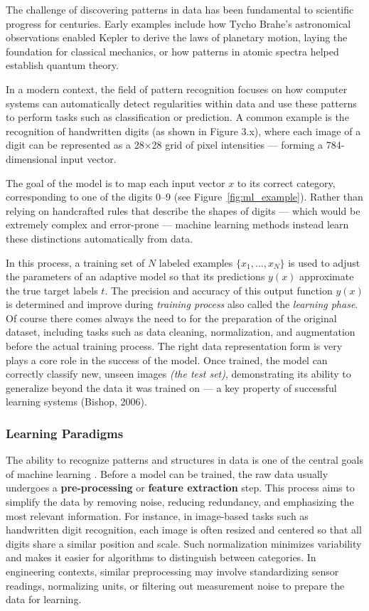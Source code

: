 \documentclass[12pt]{article}
\begin{document}
The challenge of discovering patterns in data has been fundamental to scientific progress for centuries. 
Early examples include how Tycho Brahe’s astronomical observations enabled Kepler to derive the laws of planetary motion, 
laying the foundation for classical mechanics, or how patterns in atomic spectra helped establish quantum theory.

In a modern context, the field of pattern recognition focuses on how computer systems can automatically detect regularities 
within data and use these patterns to perform tasks such as classification or prediction. A common example is the recognition 
of handwritten digits (as shown in Figure 3.x), where each image of a digit can be represented as a 28×28 grid of pixel 
intensities — forming a 784-dimensional input vector.

The goal of the model is to map each input vector $x$ to its correct category, corresponding to one of the digits 0–9 
(see Figure~\ref{fig:ml_example}). Rather than relying on handcrafted rules that describe the shapes of digits — which 
would be extremely complex and error-prone — machine learning methods instead learn these distinctions automatically from data.

In this process, a training set of $N$ labeled examples $\{x_1, \dots, x_N\}$ is used to adjust the parameters of an 
adaptive model so that its predictions $y(x)$ approximate the true target labels $t$. The precision and accuracy of this output function $y(x)$ is determined and improve during 
\emph{training process} also called the \emph{learning phase}. Of course there comes always the need to for the preparation 
of the original dataset, including tasks such as data cleaning, normalization, and augmentation before the actual training process.
The right data representation form is very plays a core role in the success of the model. Once trained, the model can correctly 
classify new, unseen images \emph{(the test set)}, demonstrating its ability to generalize beyond the data it was trained on — a 
key property of successful learning systems (Bishop, 2006).

\subsubsection{Learning Paradigms}

The ability to recognize patterns and structures in data is one of the central goals of machine learning \cite{bishop2006pattern}. 
Before a model can be trained, the raw data usually undergoes a \textbf{pre-processing} or \textbf{feature extraction} step. 
This process aims to simplify the data by removing noise, reducing redundancy, and emphasizing the most relevant information.
For instance, in image-based tasks such as handwritten digit recognition, each image is often resized and centered so that all digits share a similar position and scale. 
Such normalization minimizes variability and makes it easier for algorithms to distinguish between categories. 
In engineering contexts, similar preprocessing may involve standardizing sensor readings, normalizing units, or filtering out measurement noise to prepare the data for learning.
\end{document}
